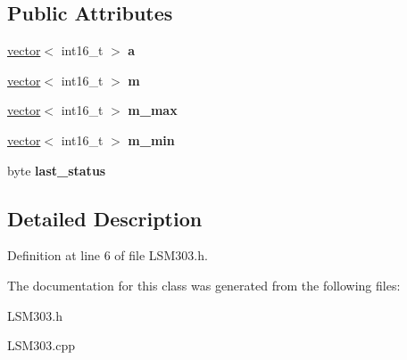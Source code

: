 \subsection*{Public Attributes}
\begin{DoxyCompactItemize}
\item 
\mbox{\label{class_l_s_m303_a7f494234f7a645807162a7992a68be9d}} 
\hyperlink{struct_l_s_m303_1_1vector}{vector}$<$ int16\+\_\+t $>$ {\bfseries a}
\item 
\mbox{\label{class_l_s_m303_a773d68d3d00d8dd0aec7e91931540495}} 
\hyperlink{struct_l_s_m303_1_1vector}{vector}$<$ int16\+\_\+t $>$ {\bfseries m}
\item 
\mbox{\label{class_l_s_m303_a46f3ac13cdd309558b9e02da105c8a93}} 
\hyperlink{struct_l_s_m303_1_1vector}{vector}$<$ int16\+\_\+t $>$ {\bfseries m\+\_\+max}
\item 
\mbox{\label{class_l_s_m303_a2e211642cfd7b18b252def22987438f2}} 
\hyperlink{struct_l_s_m303_1_1vector}{vector}$<$ int16\+\_\+t $>$ {\bfseries m\+\_\+min}
\item 
\mbox{\label{class_l_s_m303_a71331bb0974b49dd30d9748aef24836b}} 
byte {\bfseries last\+\_\+status}
\end{DoxyCompactItemize}


\subsection{Detailed Description}


Definition at line 6 of file L\+S\+M303.\+h.



The documentation for this class was generated from the following files\+:\begin{DoxyCompactItemize}
\item 
L\+S\+M303.\+h\item 
L\+S\+M303.\+cpp\end{DoxyCompactItemize}
